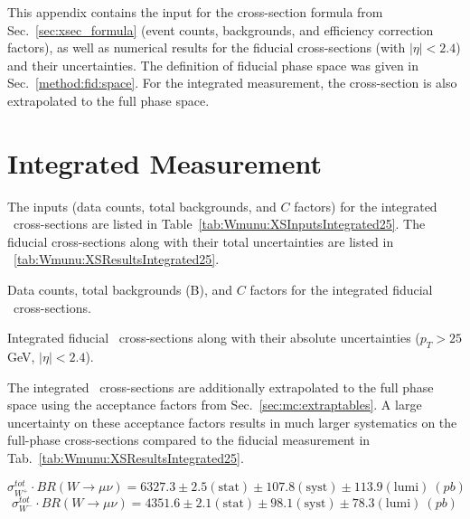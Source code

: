 This appendix contains the input for the cross-section formula from Sec.~\ref{sec:xsec_formula} (event counts, backgrounds, and efficiency correction factors), as well as numerical results for the fiducial cross-sections (with $|\eta|<2.4$) and their uncertainties. The definition of fiducial phase space was given in Sec.~\ref{method:fid:space}. For the integrated measurement, the cross-section is also extrapolated to the full phase space.

\section{Integrated Measurement}
The inputs (data counts, total backgrounds, and $C$ factors) for the integrated \Wmn\ cross-sections are listed in Table~\ref{tab:Wmunu:XSInputsIntegrated25}. The fiducial cross-sections along with their total uncertainties are listed in \Tab~\ref{tab:Wmunu:XSResultsIntegrated25}.

\begin{table}
  \begin{center}
    
    \caption{ Data counts, total backgrounds (B), and $C$ factors for the integrated fiducial \Wmn\ cross-sections. \NBCexp}
    \label{tab:Wmunu:XSInputsIntegrated25}
  \end{center}
\end{table}

\begin{table}
  \begin{center}
    
    \caption{ Integrated fiducial \Wmn\ cross-sections along with their absolute uncertainties ($p_T>25$ GeV, $|\eta|<2.4$). }
    \label{tab:Wmunu:XSResultsIntegrated25}
  \end{center}
\end{table}

The integrated \Wmn\ cross-sections are additionally extrapolated to the full phase space using the acceptance factors from Sec.~\ref{sec:mc:extraptables}. A large uncertainty on these acceptance factors results in much larger systematics on the full-phase cross-sections compared to the fiducial measurement in Tab.~\ref{tab:Wmunu:XSResultsIntegrated25}.

$$\sigma^{tot}_{W^+}\cdot BR(W \rightarrow \mu\nu) = 6327.3 \pm 2.5 (\text{stat}) \pm 107.8 (\text{syst}) \pm 113.9 (\text{lumi})\ (pb)$$
$$\sigma^{tot}_{W^-}\cdot BR(W \rightarrow \mu\nu) = 4351.6 \pm 2.1 (\text{stat}) \pm 98.1 (\text{syst}) \pm 78.3 (\text{lumi})\ (pb)$$

